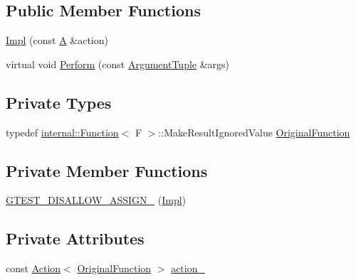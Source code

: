 \subsection*{Public Member Functions}
\begin{DoxyCompactItemize}
\item 
\hyperlink{classtesting_1_1internal_1_1IgnoreResultAction_1_1Impl_a0252ee58746d81d31b92526b2336892e}{Impl} (const \hyperlink{namespacetesting_a5e9134d655d2fc9323902348083282e7}{A} \&action)
\item 
virtual void \hyperlink{classtesting_1_1internal_1_1IgnoreResultAction_1_1Impl_ad2b7d520f2d50cf640da1a039a81684f}{Perform} (const \hyperlink{classtesting_1_1ActionInterface_af72720d864da4d606629e83edc003511}{Argument\+Tuple} \&args)
\end{DoxyCompactItemize}
\subsection*{Private Types}
\begin{DoxyCompactItemize}
\item 
typedef \hyperlink{structtesting_1_1internal_1_1Function}{internal\+::\+Function}$<$ F $>$\+::Make\+Result\+Ignored\+Value \hyperlink{classtesting_1_1internal_1_1IgnoreResultAction_1_1Impl_a00db745de37ebae1ee631240098bc2b1}{Original\+Function}
\end{DoxyCompactItemize}
\subsection*{Private Member Functions}
\begin{DoxyCompactItemize}
\item 
\hyperlink{classtesting_1_1internal_1_1IgnoreResultAction_1_1Impl_a9e4a21770e75deb8438e6ef633a638f5}{G\+T\+E\+S\+T\+\_\+\+D\+I\+S\+A\+L\+L\+O\+W\+\_\+\+A\+S\+S\+I\+G\+N\+\_\+} (\hyperlink{classtesting_1_1internal_1_1IgnoreResultAction_1_1Impl}{Impl})
\end{DoxyCompactItemize}
\subsection*{Private Attributes}
\begin{DoxyCompactItemize}
\item 
const \hyperlink{classtesting_1_1Action}{Action}$<$ \hyperlink{classtesting_1_1internal_1_1IgnoreResultAction_1_1Impl_a00db745de37ebae1ee631240098bc2b1}{Original\+Function} $>$ \hyperlink{classtesting_1_1internal_1_1IgnoreResultAction_1_1Impl_a31db8189338e8f4d5f8e21e95c0b0763}{action\+\_\+}
\end{DoxyCompactItemize}


